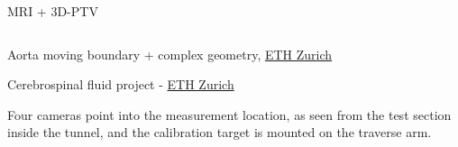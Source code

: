 \begin{frame}[label=app-15]{MRI + 3D-PTV}
    \begin{columns}
        \centering{}
    \end{columns}
\end{frame}

\begin{frame}[label=app-4a]{Aorta moving boundary + complex geometry, \href{https://www.dropbox.com/s/p1xnc7mefoqboti/aorta_rigid.mp4?dl=0}{ETH Zurich}}
\end{frame}



\begin{frame}[label=app-15b]{Cerebrospinal fluid project - \href{https://idsc.ethz.ch/research-guzzella-onder/research-projects/ProjectArchive/csf-biothermofluidics.html}{ETH Zurich}}
\end{frame}
    
\begin{frame}[label=iibr-2]
    \begin{multicols}{2}
    \centering
    \end{multicols}
    \begin{cardTiny}
    Four cameras point into the measurement location, as seen from the test section inside the tunnel, and the calibration target is mounted on the traverse arm.
    \end{cardTiny}
\end{frame}
    
